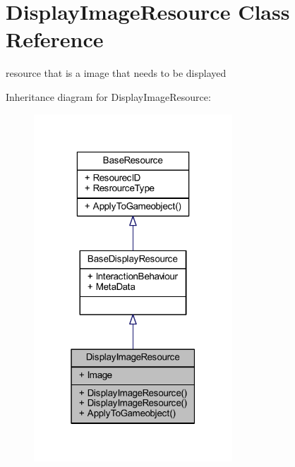 \hypertarget{class_display_image_resource}{}\section{Display\+Image\+Resource Class Reference}
\label{class_display_image_resource}


resource that is a image that needs to be displayed  




Inheritance diagram for Display\+Image\+Resource\+:
\nopagebreak
\begin{figure}[H]
\begin{center}
\leavevmode
\includegraphics[width=211pt]{class_display_image_resource__inherit__graph}
\end{center}
\end{figure}


